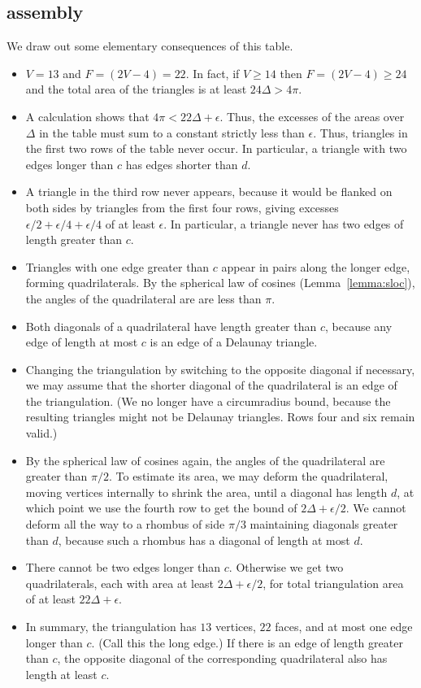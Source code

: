 \subsection{assembly}

We draw out some elementary consequences of this table.

\begin{itemize}
  \item $V=13$ and $F=(2V-4)=22$.  In fact, if $V\ge14$ then $F= (2V-4)\ge 24$ and
  the total area of the triangles is at least $24\Delta > 4\pi$.
  \item A calculation shows that $4\pi < 22\Delta+\epsilon$.
  Thus, the excesses of the areas over
  $\Delta$ in the table must sum to a constant strictly less than
  $\epsilon$.  Thus, triangles in the first two rows of the table
  never occur.  In particular, a triangle with two edges longer
  than $c$ has edges shorter than $d$.
  \item A triangle in the third row never appears, because it
  would be flanked on both sides by triangles from the first four rows,
  giving excesses $\epsilon/2 + \epsilon/4 + \epsilon/4$ of at
  least $\epsilon$. In particular, a triangle never has two edges
  of length greater than $c$.
  \item Triangles with one edge greater than $c$ appear in pairs
  along the longer edge, forming quadrilaterals. By the spherical law of cosines (Lemma~\ref{lemma:sloc}), the angles of the quadrilateral are
  are less than $\pi$. %
  \item Both diagonals of a quadrilateral have length greater than $c$,
    because any edge of length at most $c$ is an edge of a Delaunay triangle.
  \item Changing the
  triangulation by switching to the opposite diagonal if
  necessary, we may assume that the shorter diagonal of the
  quadrilateral is an edge of the triangulation.  (We no longer
  have a circumradius bound, because the resulting triangles might not be Delaunay
  triangles.  Rows four and six remain valid.)  
  \item By the spherical law of cosines again, the angles of the 
    quadrilateral are greater than $\pi/2$.
    To estimate its area, we may deform the quadrilateral, moving
  vertices internally to shrink the area, until a diagonal has length $d$, at which
  point we use the fourth row to get the bound of $2\Delta+\epsilon/2$.  We cannot deform all the way to a
  rhombus of side $\pi/3$ maintaining diagonals greater than $d$, 
  because such a rhombus has a diagonal
  of length at most $d$.
  \item There cannot be two edges longer than $c$.  Otherwise we
  get two quadrilaterals, each with area at least $2\Delta +
  \epsilon/2$, for total triangulation area of at least $22\Delta
  + \epsilon$.
  \item In summary, the triangulation has $13$ vertices, $22$
  faces, and at most one edge longer than $c$.  (Call this the long edge.)
  If there is an
  edge of length greater than $c$, the opposite diagonal of the
  corresponding quadrilateral also has length at least $c$.
\end{itemize}


